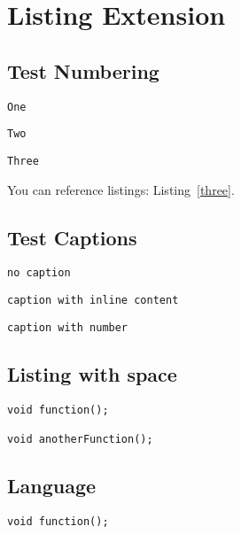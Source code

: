 
\chapter{\label{listing-extension}Listing Extension}
\section{\label{test-numbering}Test Numbering}
\begin{lstlisting}[label=one,caption=\mbox{}]
One
\end{lstlisting}

\begin{lstlisting}[label=two,caption=\mbox{}]
Two
\end{lstlisting}

\begin{lstlisting}[label=three,caption=\mbox{}]
Three
\end{lstlisting}

\par You can reference listings: Listing~\ref{three}.
\section{\label{test-captions}Test Captions}
\begin{verbatim}
no caption
\end{verbatim}

\begin{lstlisting}[title={the \textbf{caption}}]
caption with inline content
\end{lstlisting}

\begin{lstlisting}[label=four,caption={the \ul{caption}}]
caption with number
\end{lstlisting}

\section{\label{listing-with-space}Listing with space}
\begin{verbatim}
void function();

void anotherFunction();
\end{verbatim}

\section{\label{language}Language}
\begin{verbatim}
void function();
\end{verbatim}

